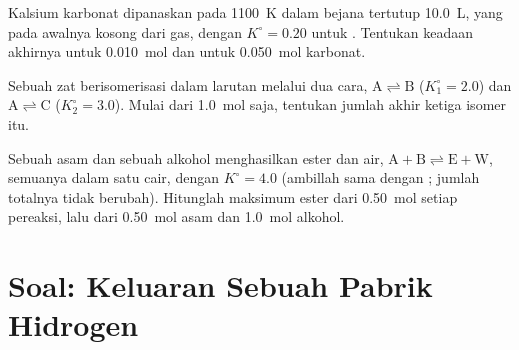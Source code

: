 \begin{exercise}[$\star\star\star$]\label{exo:b1:extent-q-and-k:10}
Kalsium karbonat dipanaskan pada \qty{1100}{K} dalam bejana tertutup
\qty{10.0}{L}, yang pada awalnya kosong dari gas, dengan $K^\circ = 0.20$
untuk . Tentukan keadaan akhirnya untuk
\qty{0.010}{mol} dan untuk \qty{0.050}{mol} karbonat.
\end{exercise}

\begin{exercise}[$\star\star\star$]\label{exo:b1:extent-q-and-k:11}
Sebuah zat  berisomerisasi dalam larutan melalui dua cara,
$\mathrm{A \rightleftharpoons B}$
($K_1^\circ = 2.0$) dan $\mathrm{A \rightleftharpoons C}$ ($K_2^\circ = 3.0$). Mulai dari
\qty{1.0}{mol}  saja, tentukan jumlah akhir ketiga isomer itu.
\end{exercise}

\begin{exercise}[$\star\star\star$]\label{exo:b1:extent-q-and-k:12}
Sebuah asam  dan sebuah alkohol  menghasilkan ester dan air,
$\mathrm{A + B
\rightleftharpoons E + W}$, semuanya dalam satu  cair, dengan $K^\circ = 4.0$
(ambillah  sama dengan ; jumlah totalnya tidak
berubah). Hitunglah  maksimum ester dari \qty{0.50}{mol} setiap
pereaksi, lalu dari \qty{0.50}{mol} asam dan \qty{1.0}{mol} alkohol.
\end{exercise}

\section{Soal: Keluaran Sebuah Pabrik Hidrogen}

